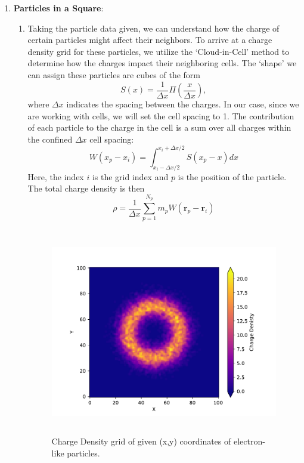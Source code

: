 \documentclass{article}
\begin{document}
\begin{enumerate}
{    }
    \item{\textbf{Particles in a Square}:
    \begin{enumerate}
        \item{Taking the particle data given, we can understand how the charge of certain particles might affect their neighbors. To arrive at a charge density grid for these particles, we utilize the `Cloud-in-Cell' method to determine how the charges impact their neighboring cells. The `shape' we can assign these particles are cubes of the form
        \begin{equation*}
            S(x) = \frac{1}{\Delta x}\Pi \left(\frac{x}{\Delta x} \right),
        \end{equation*}
        where $\Delta x$ indicates the spacing between the charges. In our case, since we are working with cells, we will set the cell spacing to 1. The contribution of each particle to the charge in the cell is a sum over all charges within the confined $\Delta x$ cell spacing:
        \begin{equation*}
            W(x_p-x_i) = \int_{x_i - \Delta x/2}^{x_i + \Delta x/2} S(x_p - x)dx
        \end{equation*}
        Here, the index $i$ is the grid index and $p$ is the position of the particle. The total charge density is then
        \begin{equation*}
            \rho = \frac{1}{\Delta x}\sum_{p = 1}^{N_p}m_pW(\pmb{r}_p - \pmb{r}_i)
        \end{equation*}
        \begin{figure}[tp]
            \centering
            \includegraphics[width=\textwidth, height=9cm]{cahrge_density.pdf}
            \caption{Charge Density grid of given (x,y) coordinates of electron-like particles.}

\end{figure}}
\end{enumerate}}
\end{enumerate}
\end{document}
